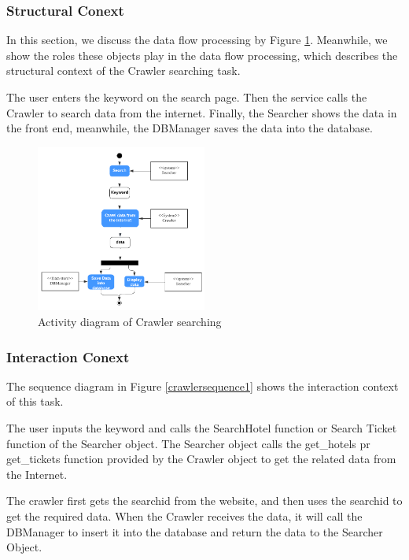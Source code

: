 \documentclass[conference]{IEEEtran}
\begin{document}
\subsubsection{\textbf{Structural Conext }}
\textbf{}

In this section, we discuss the data flow processing by Figure \ref{crawleractivity1}. Meanwhile, we show the roles these objects play in the data flow processing, which describes the structural context of the Crawler searching task.

The user enters the keyword on the search page. Then the service calls the Crawler to search data from the internet. Finally, the Searcher shows the data in the front end, meanwhile, the DBManager saves the data into the database.
\begin{figure}[htbp]
	\centerline{\includegraphics[width=0.5\textwidth]{image/crawler activity1.pdf}}
	\caption{Activity diagram of Crawler searching }
	\label{crawleractivity1}
\end{figure}


\subsubsection{\textbf{Interaction Conext }}
\textbf{}

The sequence diagram in Figure \ref{crawlersequence1} shows the interaction context of this task. 

The user inputs the keyword and calls the SearchHotel function or Search Ticket function of the Searcher object. The Searcher object calls the get\_hotels pr get\_tickets function provided by the Crawler object to get the related data from the Internet.

The crawler first gets the searchid from the website, and then uses the searchid to get the required data. When the Crawler receives the data, it will call the DBManager to insert it into the database and return the data to the Searcher Object.
\end{document}

